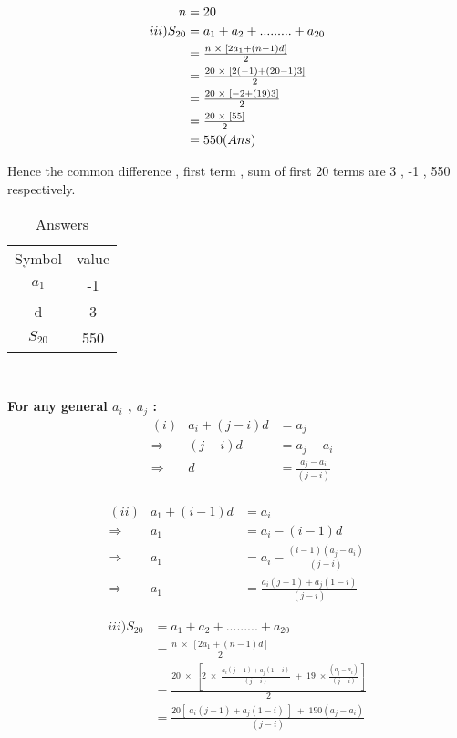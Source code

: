 \documentclass[journal, 12pt, twocolumn]{IEEEtran}
\begin{document}
    \pagebreak
   
    \begin{align*}
\LARGE        n &= 20 \\ 
        iii)  S_{20} &= a_1 + a_2 + ......... + a_{20}\\
               &= \tfrac{n\;\times\;\left[2a_1 + (n-1)d\right]}{2} \\
               &= \tfrac{20\;\times\;[2(-1) + (20-1)3] }{2} \\
               &= \tfrac{20\;\times\;[-2 + (19)3]}{2} \\
               &= \tfrac{20\; \times  \;[55]}{2} \\
               &= 550 (Ans)
\end{align*} 

Hence the common difference , first term , sum of first 20 terms are  3 , -1 , 550 respectively.

\begin{table}[h!]
\caption{Answers}
    \centering
    \begin{tabular}{|c|c|}
        \hline
        Symbol & value \\
         $ a_1 $ &  -1  \\
          d    &   3  \\
         $ S_{20} $   &   550  \\
          \hline 
    \end{tabular}\\
\end{table}


\textbf{For any general $a_i$ , $a_j$ :}\\
\begin{align*}
        &(i)&a_i + (j-i)d &= a_j\\
        &\Rightarrow & (j-i)d &= a_j - a_i\\
        &\Rightarrow & d  &= \tfrac{a_j - a_i}{(j-i)} \\
    \end{align*}
    
     \begin{align*}
        &(ii)&a_1 + (i-1)d &= a_i\\
        &\Rightarrow & a_1 &= a_i - (i-1)d\\
        &\Rightarrow & a_1 &=  a_i - \tfrac{(i-1)(a_j - a_i)}{(j-i)} \;\;\;\\ 
        &\Rightarrow & a_1 &=  \tfrac{a_i(j-1)+a_j(1-i)}{(j-i)} \; 
    \end{align*}
    
    \begin{align*}
        iii)  S_{20} &= a_1 + a_2 + ......... + a_{20}\\
               &= \tfrac{n\;\times\;\left[2a_1 + (n-1)d\right]}{2} \\
               &= \tfrac{20\;\times\;\left[2\;\times\;\tfrac{a_i(j-1)+a_j(1-i)}{(j-i)}\; +\;19\;\times\tfrac{(a_j - a_i)}{(j-i)}\right]}{2} \\
               &= \tfrac{20\left[\;a_i(j-1) + a_j(1-i)\;\right]\;+\;190(a_j - a_i)}{(j-i)} \\
\end{align*} 

    
    
\end{document}
